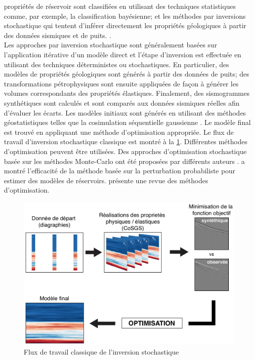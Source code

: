 propriétés de réservoir sont classifiées en utilisant des techniques
statistiques comme, par exemple, la classification bayésienne; et les méthodes
par
inversions stochastique qui tentent d'inférer directement les propriétés
géologiques à partir
des données sismiques et de puits. \citep{Grana2012}.\\
Les approches par inversion stochastique sont généralement basées sur
l'application itérative d'un modèle direct et l'étape d'inversion est effectuée
en utilisant des techniques déterministes ou stochastiques. En particulier, des
modèles de propriétés géologiques sont générés à partir des données de puits;
des transformations
pétrophysiques sont ensuite appliquées de façon à générer les volumes
correspondants des propriétés élastiques. Finalement, des sismogrammes
synthétiques sont calculés et sont comparés  aux données sismiques réelles afin
d'évaluer les écarts. Les modèles initiaux sont générés en utilisant des
méthodes géostatistiques telles que la cosimulation séquentielle gaussienne
\citep{Deutsch1998,Doyen2007}. Le modèle final est trouvé en appliquant une
méthode d’optimisation appropriée. Le flux de travail d’inversion stochastique
classique est montré à la \cref{fig:inversion}. Différentes méthodes
d'optimisation peuvent être utilisées. Des approches d'optimisation stochastique
basée sur les méthodes Monte-Carlo ont été proposées par différents auteurs
\citep{Eidsvik2004,Larsen2006,Gunning2007,Rimstad2010,Ulvmoen2010,Hansen2012}.
\citet{Grana2012} a montré l’efficacité de la méthode basée sur la perturbation
probabiliste \citep{Caers2006} pour estimer des modèles de réservoirs.
\citet{Bosch2010} présente une revue des méthodes d'optimisation.
\begin{figure}[!ht]
\centering
\includegraphics[width=1\textwidth]{fig/inversion.pdf}
\caption{Flux de travail classique de l'inversion stochastique}
\label{fig:inversion}
\end{figure}
